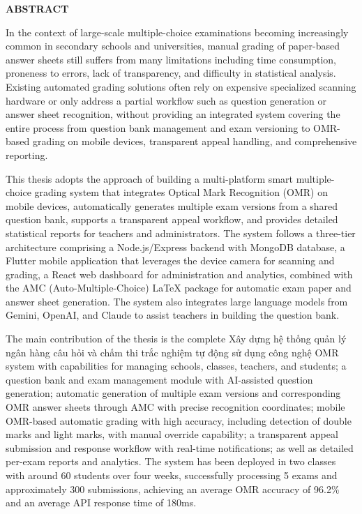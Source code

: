 ﻿\documentclass[../DoAn.tex]{subfiles}
\begin{document}
\begin{center}
    \Large{\textbf{ABSTRACT}}\\
\end{center}
\vspace{1cm}
In the context of large-scale multiple-choice examinations becoming increasingly common in secondary schools and universities, manual grading of paper-based answer sheets still suffers from many limitations including time consumption, proneness to errors, lack of transparency, and difficulty in statistical analysis. Existing automated grading solutions often rely on expensive specialized scanning hardware or only address a partial workflow such as question generation or answer sheet recognition, without providing an integrated system covering the entire process from question bank management and exam versioning to OMR-based grading on mobile devices, transparent appeal handling, and comprehensive reporting.

This thesis adopts the approach of building a multi-platform smart multiple-choice grading system that integrates Optical Mark Recognition (OMR) on mobile devices, automatically generates multiple exam versions from a shared question bank, supports a transparent appeal workflow, and provides detailed statistical reports for teachers and administrators. The system follows a three-tier architecture comprising a Node.js/Express backend with MongoDB database, a Flutter mobile application that leverages the device camera for scanning and grading, a React web dashboard for administration and analytics, combined with the AMC (Auto-Multiple-Choice) LaTeX package for automatic exam paper and answer sheet generation. The system also integrates large language models from Gemini, OpenAI, and Claude to assist teachers in building the question bank.

The main contribution of the thesis is the complete Xây dựng hệ thống quản lý ngân hàng câu hỏi và chấm thi trắc nghiệm tự động sử dụng công nghệ OMR system with capabilities for managing schools, classes, teachers, and students; a question bank and exam management module with AI-assisted question generation; automatic generation of multiple exam versions and corresponding OMR answer sheets through AMC with precise recognition coordinates; mobile OMR-based automatic grading with high accuracy, including detection of double marks and light marks, with manual override capability; a transparent appeal submission and response workflow with real-time notifications; as well as detailed per-exam reports and analytics. The system has been deployed in two classes with around 60 students over four weeks, successfully processing 5 exams and approximately 300 submissions, achieving an average OMR accuracy of 96.2\% and an average API response time of 180ms.
\end{document}
